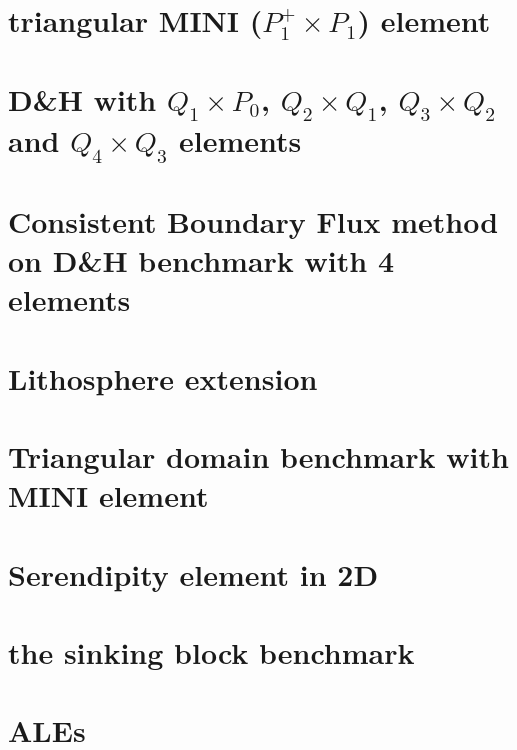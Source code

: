 \documentclass[a4paper,11pt]{report}
\begin{document}
\chapter{triangular MINI ($P_1^+\times P_1$) element \label{f47}} 

\chapter{D\&H with $Q_1\times P_0$, $Q_2\times Q_1$, $Q_3\times Q_2$ and $Q_4\times Q_3$ elements
\label{f48}} 

\chapter{Consistent Boundary Flux method on D\&H benchmark with 4 elements \label{f49}} 

\chapter{Lithosphere extension \label{f50}} 

\chapter{Triangular domain benchmark with MINI element\label{f51}} 

\chapter{Serendipity element in 2D \label{f52}} 

\chapter{the sinking block benchmark \label{f53}} 

\chapter{ALEs  \label{f54}} 
\end{document}
